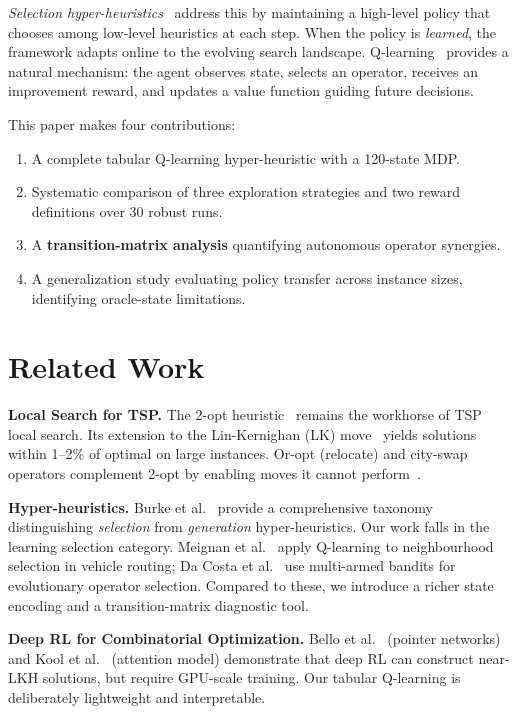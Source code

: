\documentclass[10pt,twocolumn]{article}
\begin{document}
\emph{Selection hyper-heuristics}~\cite{burke10} address this by maintaining a
high-level policy that chooses among low-level heuristics at each step. When
the policy is \emph{learned}, the framework adapts online to the evolving
search landscape. Q-learning~\cite{watkins92} provides a natural mechanism:
the agent observes state, selects an operator, receives an improvement reward,
and updates a value function guiding future decisions.

This paper makes four contributions:
\begin{enumerate}\itemsep0pt
  \item A complete tabular Q-learning hyper-heuristic with a 120-state MDP.
  \item Systematic comparison of three exploration strategies and two reward definitions over 30 robust runs.
  \item A \textbf{transition-matrix analysis} quantifying autonomous operator synergies.
  \item A generalization study evaluating policy transfer across instance sizes, identifying oracle-state limitations.
\end{enumerate}

\section{Related Work}

\textbf{Local Search for TSP.}
The 2-opt heuristic~\cite{lin65} remains the workhorse of TSP local search.
Its extension to the Lin-Kernighan (LK) move~\cite{lin73} yields solutions
within 1--2\% of optimal on large instances. Or-opt (relocate) and city-swap
operators complement 2-opt by enabling moves it cannot perform~\cite{or76}.

\textbf{Hyper-heuristics.}
Burke et al.~\cite{burke10} provide a comprehensive taxonomy distinguishing
\emph{selection} from \emph{generation} hyper-heuristics. Our work falls in
the learning selection category. Meignan et al.~\cite{meignan15} apply
Q-learning to neighbourhood selection in vehicle routing; Da Costa et
al.~\cite{dacosta08} use multi-armed bandits for evolutionary operator
selection. Compared to these, we introduce a richer state encoding and a
transition-matrix diagnostic tool.

\textbf{Deep RL for Combinatorial Optimization.}
Bello et al.~\cite{bello16} (pointer networks) and Kool et al.~\cite{kool19}
(attention model) demonstrate that deep RL can construct near-LKH solutions,
but require GPU-scale training. Our tabular Q-learning is deliberately
lightweight and interpretable.
\end{document}
